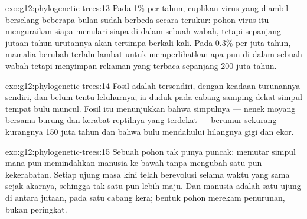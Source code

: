 \begin{solution}{exo:g12:phylogenetic-trees:13}
Pada 1\% per tahun, cuplikan virus yang diambil berselang beberapa
bulan sudah berbeda secara terukur: pohon virus itu menguraikan siapa
menulari siapa di dalam sebuah wabah, tetapi sepanjang jutaan tahun
urutannya akan tertimpa berkali-kali. Pada 0.3\% per juta tahun, 
mamalia berubah terlalu lambat untuk memperlihatkan apa pun di dalam
sebuah wabah tetapi menyimpan rekaman yang terbaca sepanjang 200 juta
tahun.
\end{solution}

\begin{solution}{exo:g12:phylogenetic-trees:14}
Fosil adalah  tersendiri, dengan keadaan turunannya sendiri,
dan belum tentu  leluhurnya; ia duduk pada cabang samping
dekat simpul tempat bulu muncul. Fosil itu menunjukkan bahwa simpulnya
--- nenek moyang bersama burung dan kerabat reptilnya yang terdekat
--- berumur sekurang-kurangnya 150 juta tahun dan bahwa bulu mendahului
hilangnya gigi dan ekor.
\end{solution}

\begin{solution}{exo:g12:phylogenetic-trees:15}
Sebuah pohon tak punya puncak: memutar simpul mana pun memindahkan
manusia ke bawah tanpa mengubah satu pun kekerabatan. Setiap ujung
masa kini telah berevolusi selama waktu yang sama sejak akarnya,
sehingga tak satu pun lebih maju. Dan manusia adalah satu ujung di
antara jutaan, pada satu cabang kera; bentuk pohon merekam penurunan,
bukan peringkat.
\end{solution}


